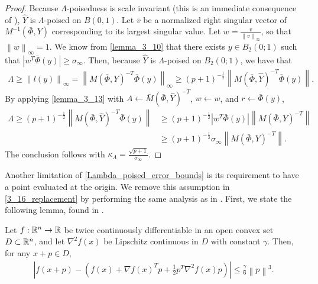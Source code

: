 \begin{proof}
Because $\Lambda$-poisedness is scale invariant (this is an immediate consequence of \cite[Lemma 3.8]{introduction_book}), 
$\hat Y$ is $\Lambda$-poised on $B(0, 1)$.
Let $\bar v$ be a normalized right singular vector of $M^{-1}\left(\bar \Phi, Y\right)$ corresponding to its largest singular value.
Let $w = \frac{v}{\left\|v\right\|_{\infty}}$, so that $\left\|w\right\|_{\infty} = 1$.
We know from \cref{lemma_3_10} that there exists $y \in B_2\left(0; 1\right)$ such that
$\left| w^T \bar {\Phi}(y) \right| \ge {\sigma_{\infty}}$.
Then, because $\hat Y$ is $\Lambda$-poised on $B_2(0; 1)$, we have that 
\begin{align*}
\Lambda 
\ge \left\|l(y)\right\|_{\infty} 
= \left\|M\left(\bar \Phi, Y\right)^{-T} \bar \Phi(y)\right\|_{\infty}
\ge \left(p+1\right)^{-\frac1 2 }\left\|M\left(\bar \Phi, \hat Y\right)^{-T} \bar{\Phi}(y)\right\|.
\end{align*}
By applying \cref{lemma_3_13} with $A\gets{\bar M}\left(\bar \Phi, \hat Y\right)^{-T}$, $w \gets w$, and $r \gets \bar \Phi(y)$,
\begin{align*}
\Lambda 
\ge \left(p+1\right)^{-\frac1 2 }\left\|M\left(\bar \Phi, \hat Y\right)^{-T} \bar{\Phi}(y)\right\|
&\ge \left(p+1\right)^{-\frac1 2 }|w^T \bar \Phi(y)| \left\|M\left(\bar \Phi, Y\right)^{-T}\right\| \\
&\ge \left(p+1\right)^{-\frac1 2 }\sigma_{\infty} \left\|M\left(\bar \Phi, Y\right)^{-T}\right\|.
\end{align*}
The conclusion follows with $\kappa_{\Lambda} = \frac {\sqrt{p+1}}{\sigma_{\infty}}$.

\end{proof}


Another limitation of \cref{Lambda_poised_error_bounds} is its requirement to have a point evaluated at the origin.
We remove this assumption in \cref{3_16_replacement} by performing the same analysis as in \cite[Theorem 3.16]{introduction_book}.
First, we state the following lemma, found in \cite[Lemma 4.1.14]{dennisschnabel1983}.

\begin{theorem}
\label{4_1_14}
Let $f : \mathbb R^n \to \mathbb R$ be twice continuously differentiable in an open convex set $D \subset \mathbb R^n$,
and let $\nabla^2 f(x)$ be Lipschitz continuous in $D$ with constant $\gamma$.
Then, for any $x + p\in D$,
\begin{align*}
\left|f(x + p) - \left(f(x) + \nabla f(x)^T p + \frac 1 2 p^T \nabla^2 f(x)p\right) \right|
\le \frac {\gamma} 6 \left\|p\right\|^3.
\end{align*}
\end{theorem}

